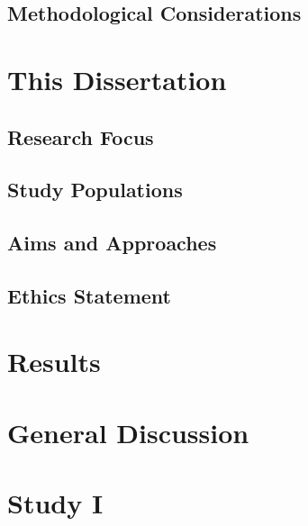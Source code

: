 \documentclass[
]{scrbook}
\begin{document}
\section{Methodological Considerations}\label{methodological-considerations}

\chapter{This Dissertation}\label{aims}

\section{Research Focus}\label{research-focus}

\section{Study Populations}\label{study-populations}

\section{Aims and Approaches}\label{aims-and-approaches}

\section{Ethics Statement}\label{ethics-statement}

\chapter{Results}\label{results}

\chapter{General Discussion}\label{discussion}

\chapter{Study I}\label{studyI}

\begin{minipage}{\textwidth}

\end{minipage}


\end{document}

